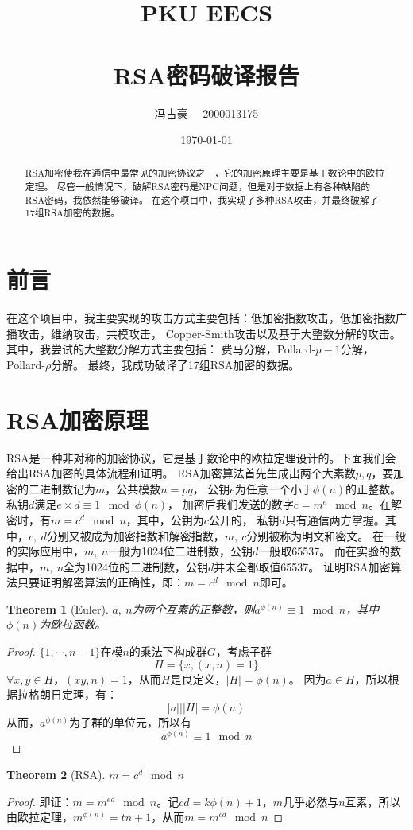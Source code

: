 \documentclass{ctexart}
\title{	
\normalfont \normalsize 
\textsc{PKU EECS} \\
\horrule{0.5pt} \\[0.4cm] 
\huge RSA密码破译报告
\horrule{2pt} \\[0.5cm] 
}
\author{冯古豪 \ \ 2000013175}
\date{\today}
\newtheorem{theorem}{Theorem}
\begin{document}
\maketitle
\newpage
\tableofcontents
\newpage

\begin{abstract}
    RSA加密使我在通信中最常见的加密协议之一，它的加密原理主要是基于数论中的欧拉定理。
    尽管一般情况下，破解RSA密码是NPC问题，但是对于数据上有各种缺陷的RSA密码，我依然能够破译。
    在这个项目中，我实现了多种RSA攻击，并最终破解了17组RSA加密的数据。
\end{abstract}

\section{前言}\label{section-introduction}
在这个项目中，我主要实现的攻击方式主要包括：低加密指数攻击，低加密指数广播攻击，维纳攻击，共模攻击，
Copper-Smith攻击以及基于大整数分解的攻击。其中，我尝试的大整数分解方式主要包括：
费马分解，Pollard-$p-1$分解，Pollard-$\rho$分解。
最终，我成功破译了17组RSA加密的数据。
\section{RSA加密原理}
RSA是一种非对称的加密协议，它是基于数论中的欧拉定理设计的。下面我们会给出RSA加密的具体流程和证明。
RSA加密算法首先生成出两个大素数$p,q$，要加密的二进制数记为$m$，公共模数$n=pq$，
公钥$e$为任意一个小于$\phi(n)$的正整数。私钥$d$满足$e\times d\equiv 1 \mod{\phi(n)}$，
加密后我们发送的数字$c=m^e \mod n$。在解密时，有$m=c^d\mod n$，其中，公钥为$c$公开的，
私钥$d$只有通信两方掌握。其中，$c,\ d$分别又被成为加密指数和解密指数，$m,\ c$分别被称为明文和密文。
在一般的实际应用中，$m,\ n$一般为1024位二进制数，公钥$d$一般取65537。
而在实验的数据中，$m,\ n$全为1024位的二进制数，公钥$d$并未全都取值65537。
证明RSA加密算法只要证明解密算法的正确性，即：$m=c^d \mod n$即可。
\begin{theorem}[Euler]
    $a,\ n$为两个互素的正整数，则$a^{\phi(n)}\equiv 1\mod{n}$，其中$\phi(n)$为欧拉函数。
\end{theorem}
\begin{proof}
$\{1,\cdots,n-1\}$在模$n$的乘法下构成群$G$，考虑子群
$$
H=\{x,(x,n)=1\} 
$$
$\forall x,y\in H$，$(xy,n)=1$，从而$H$是良定义，$|H|=\phi(n)$。
因为$a\in H$，所以根据拉格朗日定理，有：
$$
|a| \vert|H|=\phi(n)
$$
从而，$a^{\phi(n)}$为子群的单位元，所以有
$$
a^{\phi(n)}\equiv 1\mod{n}
$$
\end{proof}
\begin{theorem}[RSA] 
    $m=c^d \mod n$
\end{theorem}
\begin{proof}
即证：$m=m^{ed}\mod n$。记$cd=k\phi(n)+1$，$m$几乎必然与$n$互素，所以由欧拉定理，$m^{\phi(n)}=tn+1$，从而$m=m^{cd} \mod n$
\end{proof}
\end{document}
